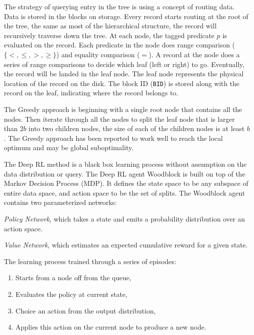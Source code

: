 The strategy of querying entry in the tree is using a concept of routing data. Data is stored in the blocks on storage. Every record starts routing at the root of the tree, the same as most of the hierarchical structure, the record will recursively traverse down the tree. At each node, the tagged predicate $p$ is evaluated on the record. Each predicate in the node does range comparison ($\{<, \leq, >, \geq\}$) and equality comparison ($=$). A record at the node does a series of range comparisons to decide which leaf (left or right) to go.  Eventually, the record will be landed in the leaf node. The leaf node represents the physical location of the record on the disk. The block ID (\texttt{BID}) is stored along with the record on the leaf, indicating where the record belongs to. 

The Greedy approach is beginning with a single root node that contains all the nodes. Then iterate through all the nodes to split the leaf node that is larger than $2b$ into two children nodes, the size of each of the children nodes is at least $b$. The Greedy approach has been reported \cite{Yang:2020ev} to work well to reach the local optimum and may be global suboptimality. 

The Deep RL method is a black box learning process without assumption on the data distribution or query. The Deep RL agent Woodblock is built on top of the Markov Decision Process (MDP). It defines the state space to be any subspace of entire data space, and action space to be the set of splits. The Woodblock agent contains two parameterized networks: 
\begin{enumerate*}
    \item \textit{Policy Network}, which takes a state and emits a probability distribution over an action space.
    \item \textit{Value Network}, which estimates an expected cumulative reward for a given state.
\end{enumerate*}
The learning process trained through a series of episodes: 
\begin{enumerate}
    \item Starts from a node off from the queue,
    \item Evaluates the policy at current state,
    \item Choice an action from the output distribution,
    \item Applies this action on the current node to produce a new node.
\end{enumerate}

